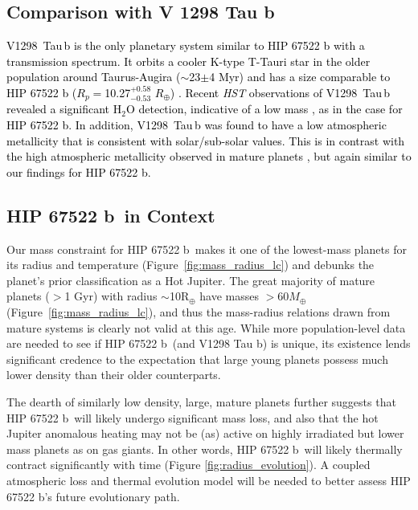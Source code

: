 \documentclass[twocolumn]{aastex63} %
\newcommand{\plname}{HIP 67522 b}
\newcommand{\newedit}[1]{\textcolor{black}{#1}}
\begin{document}
\subsection{Comparison with V 1298 Tau b}

\newedit{V1298~Tau\,b is the only planetary system similar to \plname{} with a transmission spectrum. It orbits a cooler K-type T-Tauri star in the older population around Taurus-Augira ($\sim$23$\pm$4 Myr) and has a size comparable to \plname{} ($R_{p}=$10.27$^{+0.58}_{-0.53}$ $R_{\oplus}$) \citep{v1298tau_trevor}. Recent \textit{HST} observations of V1298~Tau\,b revealed a significant H$_2$O detection, indicative of a low mass \citep[$M_{p} < 23 \pm 5 M_{\oplus}$;][]{Barat2024_V1298Taub}, as in the case for \plname. In addition, V1298~Tau\,b was found to have a low atmospheric metallicity that is consistent with solar/sub-solar values. This is in contrast with the high atmospheric metallicity observed in mature planets \citep[e.g., GJ 436 b, HD 97658 b; ][]{Madhusudhan2011ApJ_GJ436b, Guo2020AJ_HD97658b}, but again similar to our findings for \plname. }

\subsection{\plname\ in Context}


Our mass constraint for \plname\ makes it one of the lowest-mass planets for its radius and temperature (Figure~\ref{fig:mass_radius_lc}) and debunks the planet's prior classification as a Hot Jupiter. The great majority of mature planets ($>$1 Gyr) with radius $\sim$10R$_{\oplus}$ have masses $>60M_\oplus$ (Figure~\ref{fig:mass_radius_lc}), and thus the mass-radius relations drawn from mature systems is clearly not valid at this age. While more population-level data are needed to see if \plname\, (and V1298 Tau b) is unique, its existence lends significant credence to the expectation that large young planets possess much lower density than their older counterparts. 

The dearth of similarly low density, large, mature planets further suggests that \plname\, will likely undergo significant mass loss, and also that the hot Jupiter anomalous heating may not be (as) active on highly irradiated but lower mass planets as on gas giants. In other words, \plname\, will likely thermally contract significantly with time (Figure \ref{fig:radius_evolution}). A coupled atmospheric loss and thermal evolution model will be needed to better assess \plname's future evolutionary path. 
\end{document}
